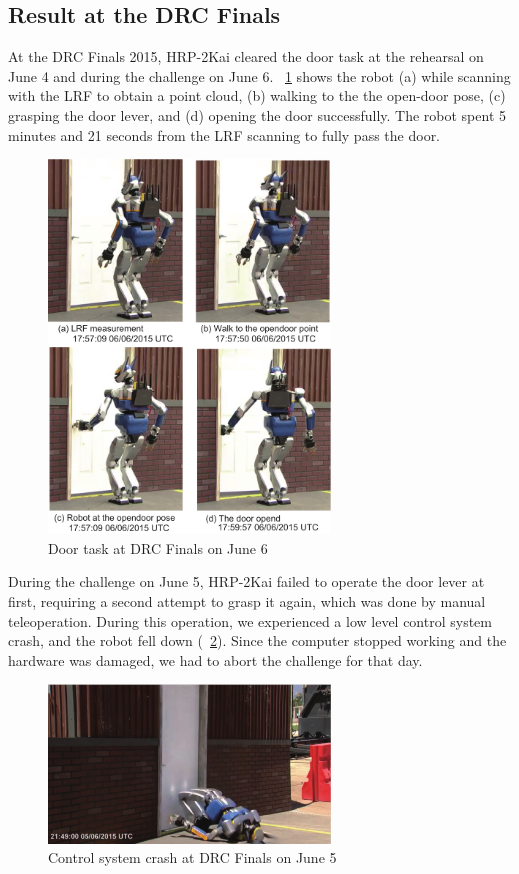 
\subsection{Result at the DRC Finals}
%
At the DRC Finals 2015, HRP-2Kai cleared the door task at the rehearsal on June 4 and during
the challenge on June 6.
\figurename~\ref{fig:drc_door_aist_day2} shows the robot (a) while scanning with the LRF to
obtain a point cloud, (b) walking to the the open-door pose, (c) grasping the door lever,
and (d) opening the door successfully.
The robot spent 5 minutes and 21 seconds from the LRF scanning to fully pass the door.
%
\begin{figure}[t]
  \centering
  \includegraphics[width = 7.5cm]{img/drc_door_aist_day2}
  \caption{Door task at DRC Finals on June 6~\cite{DARPA}}
  \label{fig:drc_door_aist_day2}
\end{figure}

During the challenge on June 5, HRP-2Kai failed to operate the door lever at first,
requiring a second attempt to grasp it again, which was done by manual teleoperation.
During this operation, we experienced a low level control system crash, and the robot
fell down (\figurename~\ref{fig:drc_door_aist_day1}).
Since the computer stopped working and the hardware was damaged, we had to abort the
challenge for that day. 
%
\begin{figure}[t]
  \centering
  \includegraphics[width = 7.5cm]{img/drc_door_aist_day1}
  \caption{Control system crash at DRC Finals on June 5~\cite{DARPA}}
  \label{fig:drc_door_aist_day1}
\end{figure}

